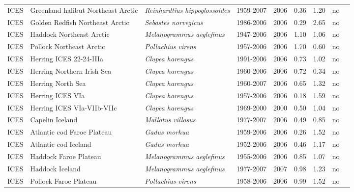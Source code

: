 \begin{longtable}{p{1.8cm}p{4cm}p{4cm}ccccp{1.9cm}c}
  ICES & Greenland halibut Northeast Arctic & \textit{Reinhardtius hippoglossoides} & 1959-2007 & 2006 & 0.36 & 1.20 & no & \cite{AFWG-GHALNEAR-1959-2007-JENNINGS} \\ 
  ICES & Golden Redfish Northeast Arctic & \textit{Sebastes norvegicus} & 1986-2006 & 2006 & 0.29 & 2.65 & no & \cite{AFWG-GOLDREDNEAR-1986-2006-MINTO} \\ 
  ICES & Haddock Northeast Arctic & \textit{Melanogrammus aeglefinus} & 1947-2006 & 2006 & 1.10 & 1.06 & no & \cite{AFWG-HADNEAR-1947-2006-MINTO} \\ 
  ICES & Pollock Northeast Arctic & \textit{Pollachius virens} & 1957-2006 & 2006 & 1.70 & 0.60 & no & \cite{AFWG-POLLNEAR-1957-2006-MINTO} \\ 
  ICES & Herring ICES 22-24-IIIa & \textit{Clupea harengus} & 1991-2006 & 2006 & 0.73 & 1.02 & no & \cite{HAWG-HERR2224IIIa-1991-2006-MINTO} \\ 
  ICES & Herring Northern Irish Sea & \textit{Clupea harengus} & 1960-2006 & 2006 & 0.72 & 0.34 & no & \cite{HAWG-HERRNIRS-1960-2006-JENNINGS} \\ 
  ICES & Herring North Sea & \textit{Clupea harengus} & 1960-2007 & 2006 & 0.65 & 1.32 & no & \cite{HAWG-HERRNS-1960-2007-MINTO} \\ 
  ICES & Herring ICES VIa & \textit{Clupea harengus} & 1957-2006 & 2006 & 0.18 & 1.59 & no & \cite{HAWG-HERRVIa-1957-2006-MINTO} \\ 
  ICES & Herring ICES VIa-VIIb-VIIc & \textit{Clupea harengus} & 1969-2000 & 2000 & 0.50 & 1.04 & no & \cite{HAWG-HERRVIaVIIbc-1969-2000-MINTO} \\ 
  ICES & Capelin Iceland & \textit{Mallotus villosus} & 1977-2007 & 2006 & 0.49 & 0.85 & no & \cite{NWWG-CAPEICE-1977-2007-MINTO} \\ 
  ICES & Atlantic cod Faroe Plateau & \textit{Gadus morhua} & 1959-2006 & 2006 & 0.26 & 1.52 & no & \cite{NWWG-CODFAPL-1959-2006-MINTO} \\ 
  ICES & Atlantic cod Iceland & \textit{Gadus morhua} & 1952-2006 & 2006 & 0.46 & 1.17 & no & \cite{NWWG-CODICE-1952-2006-MINTO} \\ 
  ICES & Haddock Faroe Plateau & \textit{Melanogrammus aeglefinus} & 1955-2006 & 2006 & 0.85 & 1.07 & no & \cite{NWWG-HADFAPL-1955-2006-MINTO} \\ 
  ICES & Haddock Iceland & \textit{Melanogrammus aeglefinus} & 1977-2007 & 2007 & 0.98 & 1.23 & no & \cite{NWWG-HADICE-1977-2007-MINTO} \\ 
  ICES & Pollock Faroe Plateau & \textit{Pollachius virens} & 1958-2006 & 2006 & 0.99 & 1.52 & no & \cite{NWWG-POLLFAPL-1958-2006-MINTO} \\ 

\end{longtable}
